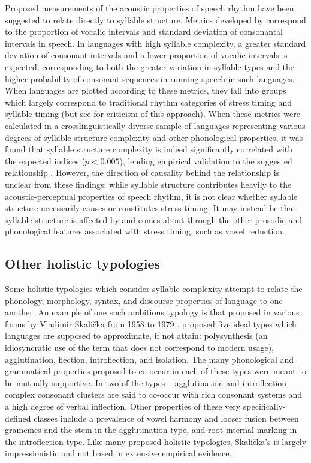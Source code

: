   Proposed measurements of the acoustic properties of speech rhythm have been suggested to relate directly to syllable structure. Metrics developed by \citet{RamusEtAl1999} correspond to the proportion of vocalic intervals and standard deviation of consonantal intervals in speech. In languages with high syllable complexity, a greater standard deviation of consonant intervals and a lower proportion of vocalic intervals is expected, corresponding to both the greater variation in syllable types and the higher probability of consonant sequences in running speech in such languages. When languages are plotted according to these metrics, they fall into groups which largely correspond to traditional rhythm categories of stress timing and syllable timing (but see \citealt{WigetEtAl2010} for criticism of this approach). When these metrics were calculated in a crosslinguistically diverse sample of languages representing various degrees of syllable structure complexity and other phonological properties, it was found that syllable structure complexity is indeed significantly correlated with the expected indices ($p < 0.005$), lending empirical validation to the suggested relationship \citep{EasterdayEtAl2011}. However, the direction of causality behind the relationship is unclear from these findings: while syllable structure contributes heavily to the acoustic-perceptual properties of speech rhythm, it is not clear whether syllable structure necessarily causes or constitutes stress timing. It may instead be that syllable structure is affected by and comes about through the other prosodic and phonological features associated with stress timing, such as vowel reduction.

\subsection{Other holistic typologies}\label{sec:1.3.2}

 Some holistic typologies which consider syllable complexity attempt to relate the phonology, morphology, syntax, and discourse properties of language to one another. An example of one such ambitious typology is that proposed in various forms by Vladimir Skalička from 1958 to 1979 \citep{Plank1998}. \citet{Skalička1979} proposed five ideal types which languages are supposed to approximate, if not attain: polysynthesis (an idiosyncratic use of the term that does not correspond to modern usage), agglutination, flection, introflection, and isolation. The many phonological and grammatical properties proposed to co-occur in each of these types were meant to be mutually supportive. In two of the types -- agglutination and introflection -- complex consonant clusters are said to co-occur with rich consonant systems and a high degree of verbal inflection. Other properties of these very specifically-defined classes include a prevalence of vowel harmony and looser fusion between gramemes and the stem in the agglutination type, and root-internal marking in the introflection type. Like many proposed holistic typologies, Skalička’s is largely impressionistic and not based in extensive empirical evidence.

